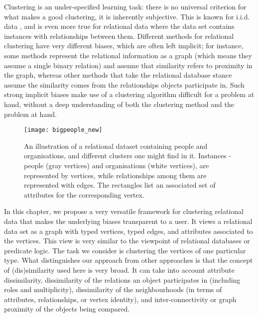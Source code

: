 Clustering is an under-specified learning task: there is no universal criterion for what makes a good clustering, it is inherently subjective.
This is known for i.i.d. data \cite{Estivill-Castro:2002}, and is even more true for relational data where the data set contains instances with relationships between them.
Different methods for relational clustering have very different biases, which are often left implicit; for instance, some methods represent the relational information as a graph (which means they assume a single binary relation) and assume that similarity refers to proximity in the graph, whereas other methods that take the relational database stance assume the similarity comes from the relationships objects participate in.
Such strong implicit biases make use of a clustering algorithm difficult for a problem at hand, without a deep understanding of both the clustering method and the problem at hand.

\begin{figure}
  \centering
  \medskip
  \texttt{[image: bigpeople\_new]}
  \caption[Example relational dataset]{An illustration of a relational dataset containing people and organisations, and different clusters one might find in it. Instances - people (gray vertices) and organisations (white vertices), are represented by vertices, while relationships among them are represented with edges. The rectangles list an associated set of attributes for the corresponding vertex.}
  \label{fig:clustering:intro}
\end{figure}


In this chapter, we propose a very versatile framework for clustering relational data that makes the underlying biases transparent to a user.
It views a relational data set as a graph with typed vertices, typed edges, and attributes associated to the vertices.
This view is very similar to the viewpoint of relational databases or predicate logic.
The task we consider is clustering the vertices of one particular type.
What distinguishes our approach from other approaches is that the concept of (dis)similarity used here is very broad.
It can take into account attribute dissimilarity, dissimilarity of the relations an object participates in (including roles and multiplicity), dissimilarity of the neighbourhoods (in terms of attributes, relationships, or vertex identity), and inter-connectivity or graph proximity of the objects being compared.


